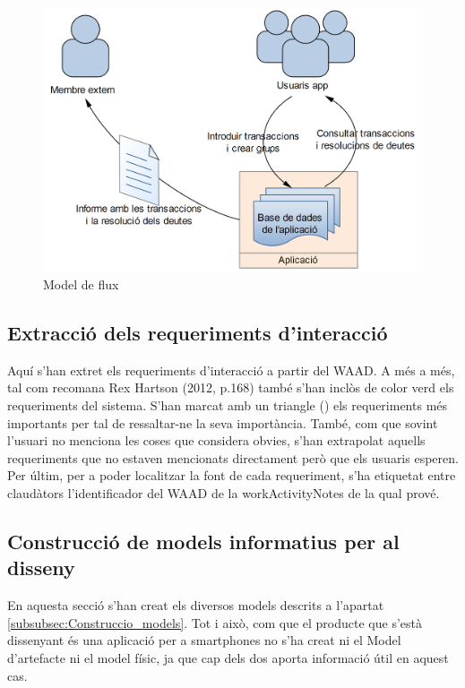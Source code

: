 \begin{figure}[htp]
\centering
\includegraphics[scale=0.5]{flow_model.png}
\caption{Model de flux}\label{fig:flow_model}
\end{figure}

\subsection{Extracció dels requeriments d'interacció}
Aquí s'han extret els requeriments d'interacció a partir del \ac{WAAD}. A més a més, tal com recomana Rex Hartson (2012, p.168) \cite{UX_Book} també s'han inclòs de color verd els requeriments del sistema. S'han marcat amb un triangle (\blacktriangle) els requeriments més importants per tal de ressaltar-ne la seva importància. També, com que sovint l'usuari no menciona les coses que considera obvies, s'han extrapolat aquells requeriments que no estaven mencionats directament però que els usuaris esperen. 
Per últim, per a poder localitzar la font de cada requeriment, s'ha etiquetat entre claudàtors l'identificador del \ac{WAAD} de la \gls{workActivityNotes} de la qual prové.

\subsection{Construcció de models informatius per al disseny}
En aquesta secció s'han creat els diversos models descrits a l'apartat \ref{subsubsec:Construccio_models}.
Tot i això, com que el producte que s'està dissenyant és una aplicació per a \glspl{smartphone} no s'ha creat ni el Model d'artefacte ni el model físic, ja que cap dels dos aporta informació útil en aquest cas. 

